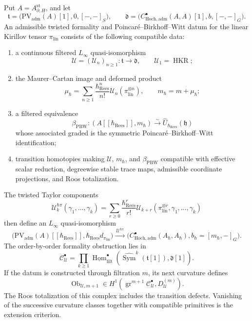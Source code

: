 \documentclass[11pt]{memoir}
\begin{document}
\begin{defn}
\label{defn:admissible-twisted-formality-pbw}
  Put \(A=A_{\partial,H}^{\mathrm{st}}\), and let
  \[
    \mathfrak t=
    \bigl(\mathrm{PV}_{\mathrm{adm}}(A)[1],0,[-,-]_S\bigr),
    \qquad
    \mathfrak d=
    \bigl(C^\bullet_{\mathrm{Hoch},\mathrm{adm}}(A,A)[1],
          b,[-,-]_G\bigr).
  \]
  An admissible twisted formality and Poincar\'e--Birkhoff--Witt
  datum for the linear Kirillov tensor \(\pi_{\mathrm{lin}}\) consists
  of the following compatible data:
  \begin{enumerate}
    \item a continuous filtered \(L_\infty\) quasi-isomorphism
    \[
      \mathcal U=(\mathcal U_n)_{n\geq1}\colon
      \mathfrak t\longrightarrow\mathfrak d,
      \qquad \mathcal U_1=\operatorname{HKR};
    \]
    \item the Maurer--Cartan image and deformed product
    \[
      \mu_\hbar=
      \sum_{n\geq1}\frac{\hbar_{\mathrm{Rees}}^n}{n!}
      \mathcal U_n(\pi_{\mathrm{lin}}^{\otimes n}),
      \qquad m_\hbar=m+\mu_\hbar;
    \]
    \item a filtered equivalence
    \[
      \beta_{\mathrm{PBW}}\colon
      (A[[\hbar_{\mathrm{Rees}}]],m_\hbar)
      \xrightarrow{\sim}
      \widehat U_{\hbar_{\mathrm{Rees}}}(\mathfrak h)
    \]
    whose associated graded is the symmetric
    Poincar\'e--Birkhoff--Witt identification;
    \item transition homotopies making \(\mathcal U\), \(m_\hbar\),
    and \(\beta_{\mathrm{PBW}}\) compatible with effective scalar
    reduction, degreewise stable trace maps, admissible coordinate
    projections, and Roos totalization.
  \end{enumerate}
  The twisted Taylor components
  \[
    \mathcal U^{\hbar\pi}_k(\gamma_1,\ldots,\gamma_k)
    =
    \sum_{r\geq0}\frac{\hbar_{\mathrm{Rees}}^r}{r!}
    \mathcal U_{k+r}
    (\pi_{\mathrm{lin}}^{\otimes r},
     \gamma_1,\ldots,\gamma_k)
  \]
  then define an \(L_\infty\) quasi-isomorphism
  \[
    \bigl(\mathrm{PV}_{\mathrm{adm}}(A)[[\hbar_{\mathrm{Rees}}]],
          \hbar_{\mathrm{Rees}}d_{\pi_{\mathrm{lin}}}\bigr)
    \xrightarrow{\ \mathcal U^{\hbar\pi}\ }
    \bigl(C^\bullet_{\mathrm{Hoch},\mathrm{adm}}(A_\hbar,A_\hbar),
          b_\hbar=[m_\hbar,-]_G\bigr).
  \]
  The order-by-order formality obstruction lies in
  \[
    \mathcal C^\bullet_{\mathcal U}
    =
    \prod_{k\geq1}
    \underline{\operatorname{Hom}}^\bullet_{\mathrm{filt}}
    \left(
      \widehat{\operatorname{Sym}}^k(\mathfrak t[1]),
      \mathfrak d[1]
    \right).
  \]
  If the datum is constructed through filtration \(m\), its next
  curvature defines
  \[
    \operatorname{Ob}_{\mathcal U,m+1}
    \in
    H^1\!\left(
      \operatorname{gr}^{m+1}\mathcal C^\bullet_{\mathcal U},
      D^{(m)}_{\mathcal U}
    \right).
  \]
  The Roos totalization of this complex includes the transition
  defects.  Vanishing of the successive curvature classes together
  with compatible primitives is the extension criterion.
\end{defn}
\end{document}
